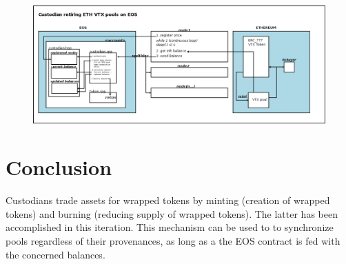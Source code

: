 \documentclass[]{article}
\begin{document}
 
 
\begin{figure}
\centering
	\includegraphics[scale=.33333]{bridge.png}
\caption{}
\label{fig:whitebackground-ecosystem02}
\end{figure}


\section{Conclusion}
Custodians trade assets for wrapped tokens by minting (creation of wrapped tokens) and burning (reducing supply of wrapped tokens). The latter has been accomplished in this iteration.
This mechanism can be used to to synchronize pools regardless of their provenances, as long as a the EOS contract is fed with the concerned balances.
\end{document}
